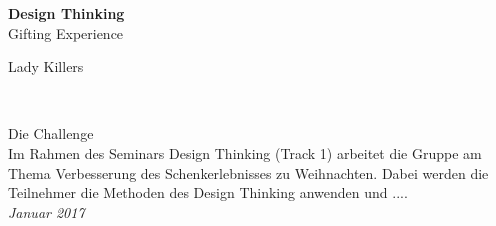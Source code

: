 \documentclass[12pt,ngerman, fleqn]{book} %
\begin{document}


\begingroup
\thispagestyle{empty}
\centering
\vspace*{5cm}
\par\normalfont\fontsize{35}{35}\sffamily\selectfont
\textbf{Design Thinking}\\
{\LARGE Gifting Experience}\par %
\vspace*{1cm}
{\Huge Lady Killers}\par %
\endgroup


\newpage
~\vfill
\thispagestyle{empty}




\noindent Die Challenge \\
Im Rahmen des Seminars Design Thinking (Track 1) arbeitet die Gruppe am Thema Verbesserung des Schenkerlebnisses zu Weihnachten. Dabei werden die Teilnehmer die Methoden des Design Thinking anwenden und .... \\ %

\noindent \textit{Januar 2017} %
\end{document}
